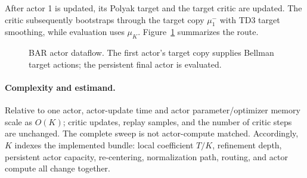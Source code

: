 After actor 1 is updated, its Polyak target and the target critic are updated. The critic subsequently bootstraps through the target copy $\mu_1^-$ with TD3 target smoothing, while evaluation uses $\mu_K$. Figure~\ref{fig:architecture} summarizes the route.

\begin{figure}[t]
\centering
{}
\caption{BAR actor dataflow. The first actor's target copy supplies Bellman target actions; the persistent final actor is evaluated.}
\label{fig:architecture}
\end{figure}

\paragraph{Complexity and estimand.}
Relative to one actor, actor-update time and actor parameter/optimizer memory scale as $O(K)$; critic updates, replay samples, and the number of critic steps are unchanged. The complete sweep is not actor-compute matched. Accordingly, $K$ indexes the implemented bundle: local coefficient $T/K$, refinement depth, persistent actor capacity, re-centering, normalization path, routing, and actor compute all change together.
